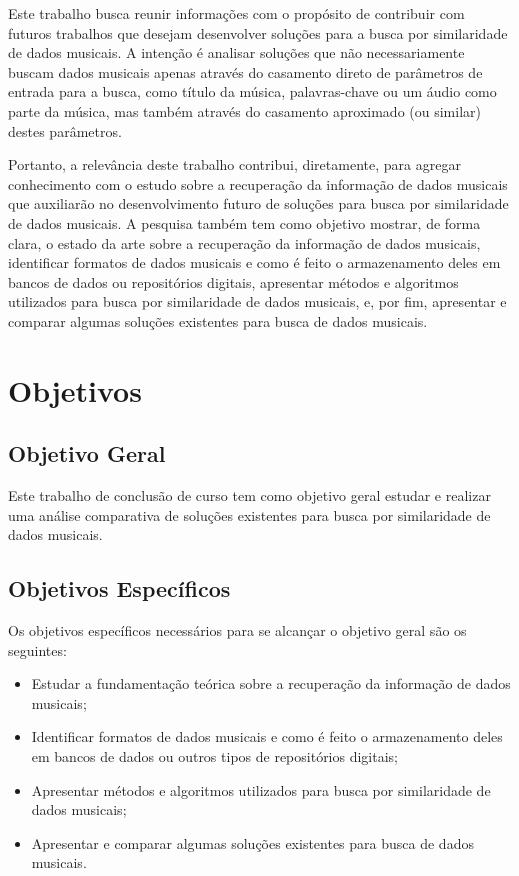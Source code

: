 Este trabalho busca reunir informações com o propósito de contribuir com futuros trabalhos que desejam desenvolver soluções para a busca por similaridade de dados musicais. A intenção é analisar soluções que não necessariamente buscam dados musicais apenas através do casamento direto de parâmetros de entrada para a busca, como título da música, palavras-chave ou um áudio como parte da música, mas também através do casamento aproximado (ou similar) destes parâmetros.

Portanto, a relevância deste trabalho contribui, diretamente, para agregar conhecimento com o estudo sobre a recuperação da informação de dados musicais que auxiliarão no desenvolvimento futuro de soluções para busca por similaridade de dados musicais. A pesquisa também tem como objetivo mostrar, de forma clara, o estado da arte sobre a recuperação da informação de dados musicais, identificar formatos de dados musicais e como é feito o armazenamento deles em bancos de dados ou repositórios digitais, apresentar métodos e algoritmos utilizados para busca por similaridade de dados musicais, e, por fim, apresentar e comparar algumas soluções existentes para busca de dados musicais.

\section{Objetivos}
\subsection{Objetivo Geral}
Este trabalho de conclusão de curso tem como objetivo geral estudar e realizar uma análise comparativa de soluções existentes para busca por similaridade de dados musicais.

\subsection{Objetivos Específicos}
Os objetivos específicos necessários para se alcançar o objetivo geral são os seguintes:

 \begin{itemize}
   \item Estudar a fundamentação teórica sobre a recuperação da informação de dados musicais;
   \item Identificar formatos de dados musicais e como é feito o armazenamento deles em bancos de dados ou outros tipos de repositórios digitais;
   \item Apresentar métodos e algoritmos utilizados para busca por similaridade de dados musicais;
   \item Apresentar e comparar algumas soluções existentes para busca de dados musicais.
 \end{itemize}
 
